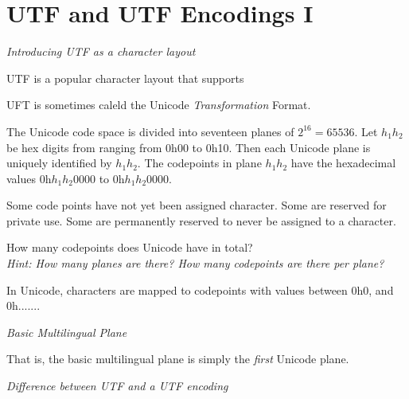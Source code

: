 \frmrule 





\section{UTF and UTF Encodings I}


\frmrule

\textit{Introducing UTF as a character layout}

UTF is a popular character layout that supports 

UFT is sometimes caleld the Unicode \textit{Transformation} Format. 

The Unicode code space is divided into seventeen planes of $2^{16} = 65536$. 
Let $h_1 h_2$ be hex digits from ranging from 0h00 to 0h10. Then 
each Unicode plane is uniquely identified by $h_1 h_2$.  
The codepoints in plane $h_1 h_2$ have the hexadecimal values 0h$h_1 h_2 0000$ to 
0h$h_1 h_2 0000$. 


Some code points have not yet been assigned character. 
Some are reserved for private use.
Some are permanently reserved to never be assigned to a character. 

\frmrule

\begin{example}
How many codepoints does Unicode have in total?\\ 
\textit{Hint: How many planes are there? How many codepoints are there per plane?}
\end{example}

\frmrule

\begin{example}
In Unicode, characters are mapped to codepoints with values between 0h0, and 0h.......
\end{example}

\frmrule

\textit{Basic Multilingual Plane}


That is, the basic multilingual plane is simply the \textit{first} Unicode plane.

\frmrule

\textit{Difference between UTF and a UTF encoding}


